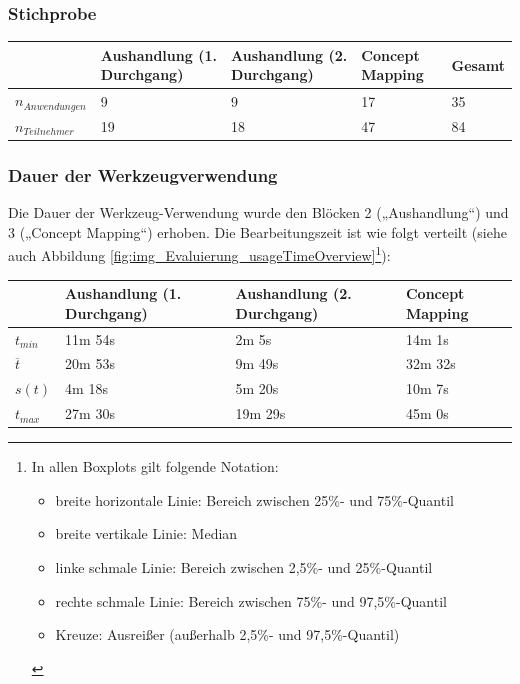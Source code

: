 \subsubsection{Stichprobe} %

\begin{tabular}{| p{2cm} || p{} | p{} | p{} || p{2cm} |}
  \hline
   & Aushandlung (1. Durchgang) & Aushandlung (2. Durchgang) & Concept Mapping & Gesamt \\ \hline
   $n_{Anwendungen}$ & 9 & 9 & 17 & 35 \\ 
   $n_{Teilnehmer}$ & 19 & 18 & 47 & 84 \\ \hline
\end{tabular} 

\subsubsection{Dauer der Werkzeugverwendung} %

Die Dauer der Werkzeug-Verwendung wurde den Blöcken 2 („Aushandlung“) und 3 („Concept Mapping“) erhoben. Die Bearbeitungszeit ist wie folgt verteilt (siehe auch Abbildung \ref{fig:img_Evaluierung_usageTimeOverview}\footnote{In allen Boxplots gilt folgende Notation: 
\begin{itemize}
	\item breite horizontale Linie: Bereich zwischen 25\%- und 75\%-Quantil
	\item breite vertikale Linie: Median
	\item linke schmale Linie: Bereich zwischen 2,5\%- und 25\%-Quantil
	\item rechte schmale Linie: Bereich zwischen 75\%- und 97,5\%-Quantil
	\item Kreuze: Ausreißer (außerhalb 2,5\%- und 97,5\%-Quantil)
\end{itemize}
}):

\begin{tabular}{| p{1cm} || p{3cm} | p{3cm} | p{3cm} |}
  \hline
   & Aushandlung (1. Durchgang) & Aushandlung (2. Durchgang) & Concept Mapping \\ \hline
   $t_{min}$ & 11m 54s & 2m 5s & 14m 1s \\ 
   $\overline{t}$ & 20m 53s & 9m 49s & 32m 32s \\ 
   $s(t)$ & 4m 18s & 5m 20s & 10m 7s \\
   $t_{max}$ & 27m 30s & 19m 29s & 45m 0s \\ \hline
\end{tabular} 

